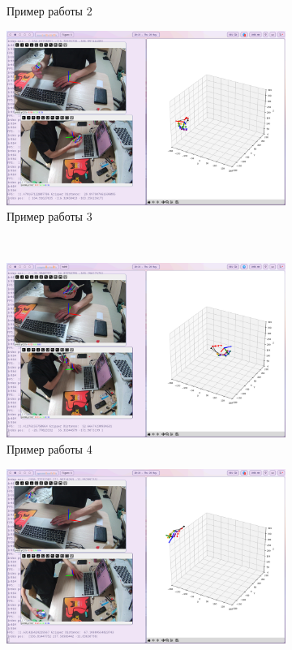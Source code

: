 \documentclass[14pt, a4paper]{extarticle}
\begin{document}
\begin{figure}[!ht]
\begin{subfigure}{0.45\textwidth}
      \caption{Пример работы 2}
    \end{subfigure}
    \hfill
    \begin{subfigure}{0.45\textwidth}
      \centering
      \includegraphics[width=\linewidth]{images/final_version_working/pose-3.png}
      \caption{Пример работы 3}
    \end{subfigure}
    \\
    \begin{subfigure}{0.45\textwidth}
      \centering
      \includegraphics[width=\linewidth]{images/final_version_working/pose-4.png}
      \caption{Пример работы 4}
    \end{subfigure}
    \hfill
    \begin{subfigure}{0.45\textwidth}
      \centering
      \includegraphics[width=\linewidth]{images/final_version_working/pose-5.png}

\end{subfigure}
\end{figure}
\end{document}
